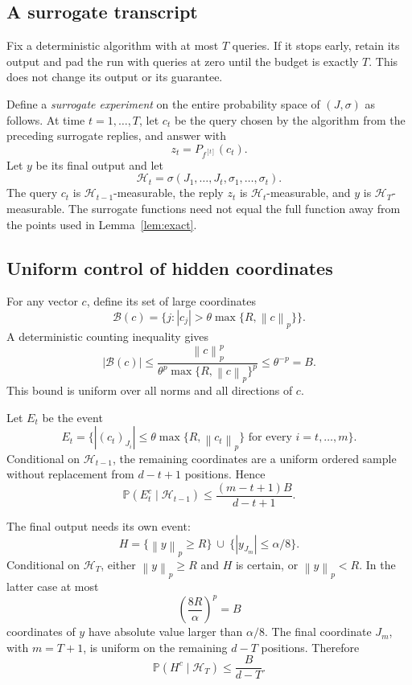 \documentclass[11pt]{article}
\theoremstyle{definition}
\theoremstyle{remark}
\newcommand{\PP}{\mathbb P}
\newcommand{\norm}[1]{\left\lVert#1\right\rVert}
\begin{document}
\subsection{A surrogate transcript}

Fix a deterministic algorithm with at most $T$ queries. If it stops early,
retain its output and pad the run with queries at zero until the budget is
exactly $T$. This does not change its output or its guarantee.

Define a \emph{surrogate experiment} on the entire probability space of
$(J,\sigma)$ as follows. At time $t=1,\ldots,T$, let $c_t$ be the query
chosen by the algorithm from the preceding surrogate replies, and answer with
\begin{equation}\label{eq:surrogate}
z_t=P_{f^{[t]}}(c_t).
\end{equation}
Let $y$ be its final output and let
\[
\mathcal H_t=\sigma(J_1,\ldots,J_t,\sigma_1,\ldots,\sigma_t).
\]
The query $c_t$ is $\mathcal H_{t-1}$-measurable, the reply $z_t$ is
$\mathcal H_t$-measurable, and $y$ is $\mathcal H_T$-measurable. The
surrogate functions need not equal the full function away from the points
used in Lemma~\ref{lem:exact}.

\subsection{Uniform control of hidden coordinates}

For any vector $c$, define its set of large coordinates
\[
\mathcal B(c)=\{j:|c_j|>\theta\max\{R,\norm{c}_p\}\}.
\]
A deterministic counting inequality gives
\begin{equation}\label{eq:count}
|\mathcal B(c)|
\le\frac{\norm{c}_p^p}{\theta^p\max\{R,\norm{c}_p\}^p}
\le\theta^{-p}=B.
\end{equation}
This bound is uniform over all norms and all directions of $c$.

Let $E_t$ be the event
\[
E_t=\bigl\{|(c_t)_{J_i}|\le\theta\max\{R,\norm{c_t}_p\}
\text{ for every }i=t,\ldots,m\bigr\}.
\]
Conditional on $\mathcal H_{t-1}$, the remaining coordinates are a uniform
ordered sample without replacement from $d-t+1$ positions. Hence
\begin{equation}\label{eq:stage-prob}
\PP(E_t^c\mid\mathcal H_{t-1})
\le\frac{(m-t+1)B}{d-t+1}.
\end{equation}

The final output needs its own event:
\begin{equation}\label{eq:output-event}
H=\{\norm{y}_p\ge R\}\ \cup\ \{|y_{J_m}|\le\alpha/8\}.
\end{equation}
Conditional on $\mathcal H_T$, either $\norm{y}_p\ge R$ and $H$ is
certain, or $\norm{y}_p<R$. In the latter case at most
\[
\left(\frac{8R}{\alpha}\right)^p=B
\]
coordinates of $y$ have absolute value larger than $\alpha/8$. The final
coordinate $J_m$, with $m=T+1$, is uniform on the remaining $d-T$ positions.
Therefore
\begin{equation}\label{eq:output-prob}
\PP(H^c\mid\mathcal H_T)\le\frac{B}{d-T}.
\end{equation}
\end{document}
